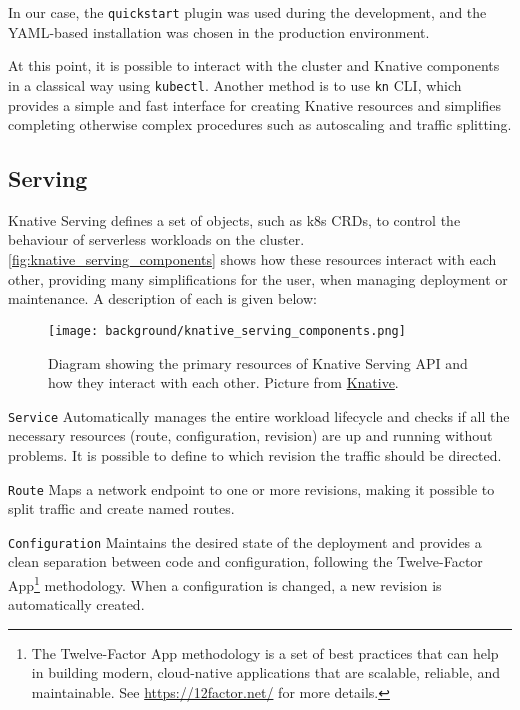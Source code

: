 \documentclass[../thesis.tex]{subfiles}
\begin{document}
In our case, the \texttt{quickstart} plugin was used during the development, and the \acrshort{YAML}-based installation was chosen in the production environment.

At this point, it is possible to interact with the cluster and Knative components in a classical way using \texttt{kubectl}. Another method is to use \texttt{kn}\cite{site:knative_cli_tools} \acrshort{CLI}, which provides a simple and fast interface for creating Knative resources and simplifies completing otherwise complex procedures such as autoscaling and traffic splitting.

\subsection{Serving}
Knative Serving defines a set of objects, such as \gls{k8s} \acrlong{CRD}s, to control the behaviour of serverless workloads on the cluster. \autoref{fig:knative_serving_components} shows how these resources interact with each other, providing many simplifications for the user, when managing deployment or maintenance. A description of each is given below:

\begin{figure}[H]
    \centering
    \texttt{[image: background/knative\_serving\_components.png]}
    \caption[Primary resources in the Knative Serving \acrshort{API}]{Diagram showing the primary resources of Knative Serving \acrshort{API} and how they interact with each other. Picture from \href{https://knative.dev/docs/serving/architecture/\#diagram}{Knative}.}
    \label{fig:knative_serving_components}
\end{figure}

\texttt{Service} Automatically manages the entire workload lifecycle and checks if all the necessary resources (route, configuration, revision) are up and running without problems. It is possible to define to which revision the traffic should be directed.

\texttt{Route} Maps a network endpoint to one or more revisions, making it possible to split traffic and create named routes.

\texttt{Configuration} Maintains the desired state of the deployment and provides a clean separation between code and configuration, following the Twelve-Factor App\footnote{The Twelve-Factor App methodology is a set of best practices that can help in building modern, cloud-native applications that are scalable, reliable, and maintainable. See \href{https://12factor.net/}{https://12factor.net/} for more details.} methodology. When a configuration is changed, a new revision is automatically created.
\end{document}
